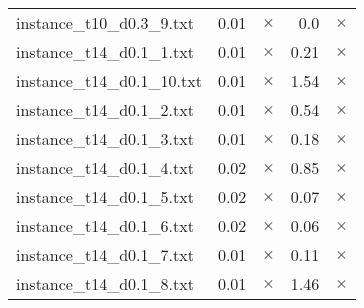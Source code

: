 \documentclass{article}
\begin{document}
\begin{center}
\begin{tabular}{lrrrr}
\\
instance\_t10\_d0.3\_9.txt & 0.01 & 
$\times$
 & 0.0 & 
$\times$
\\
instance\_t14\_d0.1\_1.txt & 0.01 & 
$\times$
 & 0.21 & 
$\times$
\\
instance\_t14\_d0.1\_10.txt & 0.01 & 
$\times$
 & 1.54 & 
$\times$
\\
instance\_t14\_d0.1\_2.txt & 0.01 & 
$\times$
 & 0.54 & 
$\times$
\\
instance\_t14\_d0.1\_3.txt & 0.01 & 
$\times$
 & 0.18 & 
$\times$
\\
instance\_t14\_d0.1\_4.txt & 0.02 & 
$\times$
 & 0.85 & 
$\times$
\\
instance\_t14\_d0.1\_5.txt & 0.02 & 
$\times$
 & 0.07 & 
$\times$
\\
instance\_t14\_d0.1\_6.txt & 0.02 & 
$\times$
 & 0.06 & 
$\times$
\\
instance\_t14\_d0.1\_7.txt & 0.01 & 
$\times$
 & 0.11 & 
$\times$
\\
instance\_t14\_d0.1\_8.txt & 0.01 & 
$\times$
 & 1.46 & 
$\times$
\\
\hline\end{tabular}
\end{center}
\end{document}
